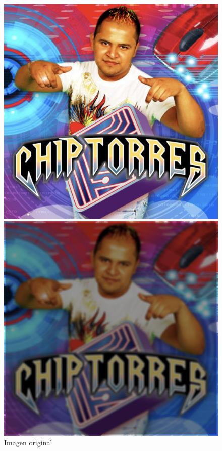 \begin{figure}[H]
	\centering
	\begin{minipage}{.3\textwidth}
		\centering
		\includegraphics[width=\linewidth]{blur_original.jpg}
		\caption{Imagen original}
		\label{fig:blur_original}
	\end{minipage}\hfill
	\begin{minipage}{.3\textwidth}
		\centering
		\includegraphics[width=\linewidth]{blur_s3_r3.jpg}

\end{minipage}
\end{figure}

